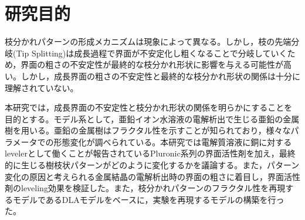 \documentclass[autodetect-engine,dvi=dvipdfmx,a4paper,ja=standard]{bxjsbook}
\begin{document}

\thispagestyle{empty}

\restoregeometry
{}

\tableofcontents
{}






\section{研究目的}
枝分かれパターンの形成メカニズムは現象によって異なる。しかし，枝の先端分岐(Tip Splitting)は成長過程で界面が不安定化し粗くなることで分岐していくため，界面の粗さの不安定性が最終的な枝分かれ形状に影響を与える可能性が高い。しかし，成長界面の粗さの不安定性と最終的な枝分かれ形状の関係は十分に理解されていない。

本研究では，成長界面の不安定性と枝分かれ形状の関係を明らかにすることを目的とする。モデル系として，亜鉛イオン水溶液の電解析出で生じる亜鉛の金属樹を用いる。亜鉛の金属樹はフラクタル性を示すことが知られており\cite{matsushita1984fractal}，様々なパラメータでの形態変化が調べられている\cite{suda2003temperature}。本研究では電解質溶液に銅に対するlevelerとして働くことが報告されているPluronic系列の界面活性剤\cite{gallaway2008peg}\cite{wu2025decoding}を加え，最終的に生じる樹枝状パターンがどのように変化するかを議論する。また，パターン変化の原因と考えられる金属結晶の電解析出時の界面の粗さに着目し，界面活性剤のleveling効果を検証した。また，枝分かれパターンのフラクタル性を再現するモデルであるDLAモデル\cite{witten1981diffusion}をベースに，実験を再現するモデルの構築を行った。




















\end{document}
